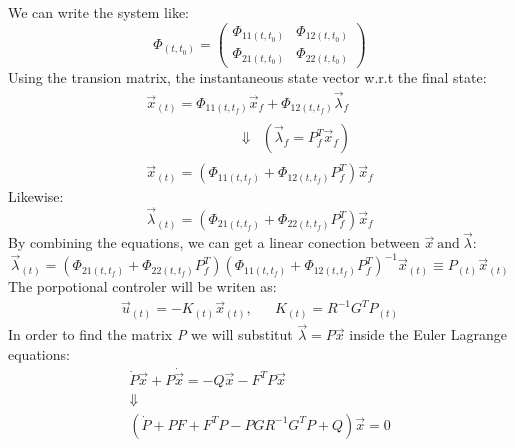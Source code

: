 \documentclass[11pt, a4paper]{article}
\begin{document}
We can write the system like:
\begin{equation}
    \Phi_{\left(t,t_0\right)}=\begin{pmatrix}
        \Phi_{11\left(t,t_0\right)} & \Phi_{12\left(t,t_0\right)} \\
        \Phi_{21\left(t,t_0\right)} & \Phi_{22\left(t,t_0\right)}
    \end{pmatrix}
\end{equation}
Using the transion matrix, the instantaneous state vector w.r.t the final state:
\begin{equation}
    \begin{matrix}
        \vec{x}_{\left(t\right)}=\Phi_{11\left(t,t_f\right)}\vec{x}_f+\Phi_{12\left(t,t_f\right)}\vec{\lambda}_f \\
        \begin{matrix}
           &&&&&&&& \Downarrow & \left(\vec{\lambda}_f=P_f^T\vec{x}_f\right)
        \end{matrix} \\
        \vec{x}_{\left(t\right)}=\left(\Phi_{11\left(t,t_f\right)}+\Phi_{12\left(t,t_f\right)}P_f^T\right)\vec{x}_f
    \end{matrix}
\end{equation}
Likewise:
\begin{equation}
    \vec{\lambda}_{\left(t\right)}=\left(\Phi_{21\left(t,t_f\right)}+\Phi_{22\left(t,t_f\right)}P_f^T\right)\vec{x}_f
\end{equation}
By combining the equations, we can get a linear conection between $\vec{x}\mathrm{\ and\ }\vec{\lambda}$:
\begin{equation}
    \vec{\lambda}_{\left(t\right)}=\left(\Phi_{21\left(t,t_f\right)}+\Phi_{22\left(t,t_f\right)}P_f^T\right)\left(\Phi_{11\left(t,t_f\right)}+\Phi_{12\left(t,t_f\right)}P_f^T\right)^{-1}\vec{x}_{\left(t\right)}\equiv P_{\left(t\right)}\vec{x}_{\left(t\right)}
\end{equation}
The porpotional controler will be writen as:
\begin{equation}
    \begin{matrix}
        \vec{u}_{\left(t\right)}=-K_{\left(t\right)}\vec{x}_{\left(t\right)}, && K_{\left(t\right)}=R^{-1}G^TP_{\left(t\right)}
    \end{matrix}
\end{equation}
In order to find the matrix \emph{P} we will substitut $\vec{\lambda}=P\vec{x}$ inside the Euler Lagrange equations:
\begin{equation}
    \begin{matrix}
        \dot{P}\vec{x}+P\dot{\vec{x}}=-Q\vec{x}-F^TP\vec{x} \\
        \Downarrow \\
        \left(\dot{P}+PF+F^TP-PGR^{-1}G^TP+Q\right)\vec{x}=0
    \end{matrix}
\end{equation}
\end{document}
